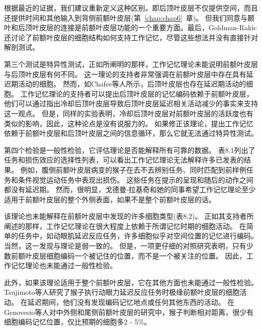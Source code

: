 根据最近的证据，我们建议重新定义这种区别，即后顶叶皮层不仅提供空间，而且还提供时间和其他输入到背侧前额叶皮层(第~\ref{chap:chap6}~章)。
但我们同意与颞叶和后顶叶皮层的连接是前额叶皮层功能的一个重要方面。最后，Goldman-Rakic还讨论了前额叶皮层的细胞结构如何支持工作记忆\cite{goldman1995cellular,constantinidis2001coding}，尽管这些想法并没有直接针对解剖测试。
\par


第三个测试是特异性测试，正如所阐明的那样，工作记忆理论未能说明前额叶皮层与后顶叶皮层有何不同。
这一理论的支持者非常强调在前额叶皮层中存在具有延迟期活动的细胞。
然而，如Chafee等人所示\cite{chafee1998matching}，后顶叶皮层也存在延迟期活动的细胞。
工作记忆理论的支持者可以提出后顶叶皮层的记忆编码依赖于前额叶皮层，他们可以通过指出冷却后顶叶皮层导致后顶叶皮层延迟相关活动减少的事实来支持这一观点\cite{chafee2000inactivation}。
但是，同样的实验表明，冷却后顶叶皮层对前额叶皮层的活跃度也有类似的影响，因此，这种论点是没有说服力的。
如果修正该理论，提出工作记忆依赖于前额叶皮层和后顶叶皮层之间的信息循环，那么它就无法通过特异性测试。
\par


第四个检验是一般性检验，它评估理论是否能解释所有可靠的数据。
表8.1列出了任务和损伤效应的选择性列表，可以看出工作记忆理论无法解释许多已发表的结果。
例如，腹侧前额叶皮层病变的猴子在去不去辨别任务\cite{iversen1970perseverative}、同时匹配到前样例任务\cite{rushworth1997ventral}和条件视觉运动任务\cite{bussey2001role}中表现出损伤。
这些任务在提示的呈现和随后的动作之间都没有延迟期。
然而，很明显，戈德曼-拉基奇和她的同事\cite{bussey2001role}希望工作记忆理论至少适用于前额叶皮层的整个外侧表面，如果不是整个前额叶皮层的话。
\par


该理论也未能解释在前额叶皮层中发现的许多细胞类型(表8.2)。
正如其支持者所阐述的那样，工作记忆理论在很大程度上依赖于所谓记忆时期的细胞活动。
在简单的任务中，如动眼肌延迟反应任务，许多细胞似乎对空间位置的记忆进行编码。
当然，这一发现与理论是弱一致的\cite{funahashi1989mnemonic}。
但是，一项更仔细的对照研究表明，只有少数前额叶皮层细胞编码一个被记住的位置，而不是一个被关注的位置\cite{lebedev2004representation}。
因此，工作记忆理论也未能通过一般性检验。
\par


此外，如果该理论适用于整个前额叶皮层，它在其他方面也未能通过一般性检验。
Tsujimoto等人\cite{tsujimoto2010evaluating}研究了猴子执行动眼力延迟反应任务时极缘前额叶皮层的细胞活动。
在延迟期间，他们没有发现编码记忆地点或任何其他东西的活动。
在Genovesio等人\cite{genovesio2011prefrontal}对中外侧和尾侧前额叶皮层的研究中，猴子判断相对距离，很少有细胞编码记忆位置，仅比预期的细胞多2 - 5\%。
\par


